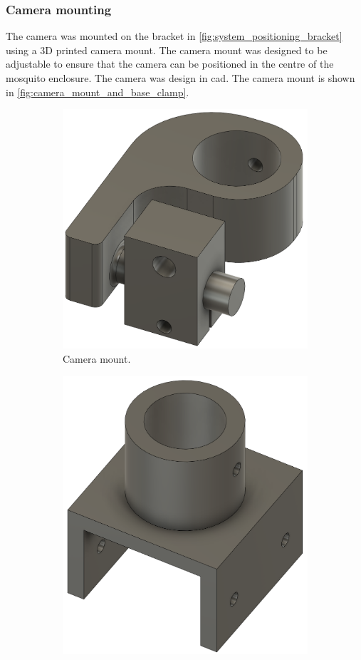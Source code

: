 \subsubsection{Camera mounting}
The camera was mounted on the bracket in \autoref{fig:system_positioning_bracket} using a 3D printed camera mount. The camera mount was designed to be adjustable to ensure that the camera can be positioned in the centre of the mosquito enclosure. The camera was design in \gls{cad}. The camera mount is shown in \autoref{fig:camera_mount_and_base_clamp}.
\begin{figure}[h]
    \centering
    \begin{subfigure}[b]{0.45\textwidth}
        \centering
        \includegraphics[width=0.8\linewidth]{figures/hardware_design/camera_and_middle_clamp.png}
        \caption{Camera mount.}
        \label{fig:camera_mount}
    \end{subfigure}
    \quad
    \begin{subfigure}[b]{0.45\textwidth}
        \centering
        \includegraphics[width=0.8\linewidth]{figures/hardware_design/camera_base_clamp.png}

\end{subfigure}
\end{figure}
